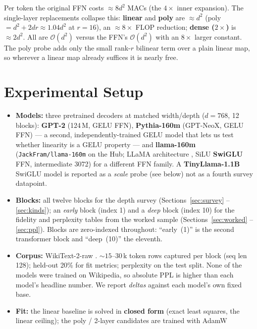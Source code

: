 \documentclass{article}
\begin{document}
Per token the original FFN costs $\approx 8d^2$ MACs (the $4\times$ inner expansion). The
single-layer replacements collapse this: \textbf{linear} and \textbf{poly} are $\approx d^2$
(poly $= d^2 + 2dr \approx 1.04 d^2$ at $r = 16$), an $\approx 8\times$ FLOP reduction;
\textbf{dense ($2\times$)} is $\approx 2d^2$. All are $\mathcal{O}(d^2)$ versus the FFN's
$\mathcal{O}(d^2)$ with an $8\times$ larger constant. The poly probe adds only the small
rank-$r$ bilinear term over a plain linear map, so wherever a linear map already suffices it
is nearly free.

\section{Experimental Setup}
\label{sec:setup}

\begin{itemize}
\item \textbf{Models:} three pretrained decoders at matched width/depth ($d = 768$, 12
  blocks): \textbf{GPT-2} \citep{radford2019gpt2} (124\,M, GELU FFN), \textbf{Pythia-160m}
  \citep{biderman2023pythia} (GPT-NeoX, GELU FFN) --- a second, independently-trained GELU
  model that lets us test whether linearity is a GELU property --- and \textbf{llama-160m}
  (\texttt{JackFram/llama-160m} on the Hub; LLaMA architecture \citep{touvron2023llama}, SiLU
  \textbf{SwiGLU} FFN, intermediate 3072) for a different FFN family. A
  \textbf{TinyLlama-1.1B} SwiGLU model is reported as a \emph{scale} probe (see below) not as a fourth survey datapoint.
\item \textbf{Blocks:} all twelve blocks for the depth survey (Sections~\ref{sec:survey} --%
 \ref{sec:kinds}); an \emph{early} block (index 1) and a \emph{deep} block (index 10) for the
 fidelity and perplexity tables from the worked sample (Sections~\ref{sec:worked} -- \ref{sec:ppl}).
  Blocks are zero-indexed throughout: ``early~(1)'' is the second transformer block and
  ``deep~(10)'' the eleventh.
\item \textbf{Corpus:} WikiText-2-raw \citep{merity2017pointer}. ${\sim}15$--$30$\,k token
  rows captured per block (seq len 128); held-out 20\% for fit metrics; perplexity on the
  test split. None of the models were trained on Wikipedia, so absolute PPL is higher than
  each model's headline number. We report \emph{deltas} against each model's own fixed base.
\item \textbf{Fit:} the linear baseline is solved in \textbf{closed form} (exact least
  squares, the linear ceiling); the poly / 2-layer candidates are trained with AdamW

\end{itemize}
\end{document}
